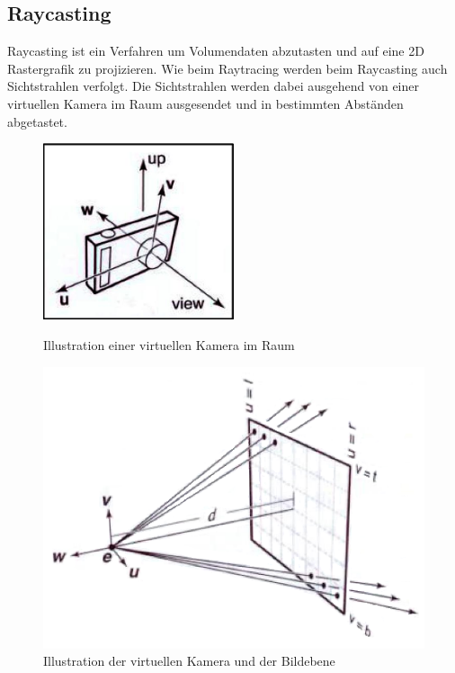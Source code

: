 \subsection{Raycasting}\label{sec::rc}
Raycasting ist ein Verfahren um Volumendaten abzutasten und auf eine 2D Rastergrafik zu projizieren.
Wie beim Raytracing werden beim Raycasting auch Sichtstrahlen verfolgt.
Die Sichtstrahlen werden dabei ausgehend von einer virtuellen Kamera im Raum ausgesendet und in bestimmten Abständen abgetastet.
\begin{figure}[]
	\centering
	\begin{minipage}[b]{0.49\textwidth}
		\centering
		\includegraphics[width=0.5\textwidth]{../../Grafiken/Virtuelle-Kamera.PNG}
		\caption{Illustration einer virtuellen Kamera im Raum \cite{Dr.MichaelKrone2016/2017}}
		\label{fig::rc01}
	\end{minipage}
	\hfill
	\begin{minipage}[b]{0.49\textwidth}
		\centering
		\includegraphics[width=1\textwidth]{../../Grafiken/Virtuelle-Kamera-und-Bildebene.PNG}
		\caption{Illustration der virtuellen Kamera und der Bildebene \cite{Dr.MichaelKrone2016/2017}}
		\label{fig::rc02}
	\end{minipage}
\end{figure}
